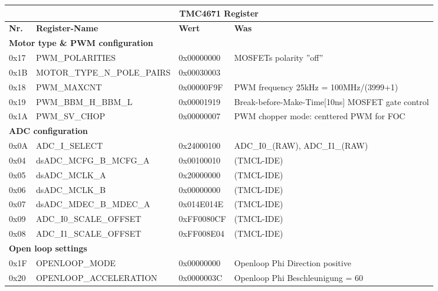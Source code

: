 \begin{table}[H]
\begin{tabularx}{\textwidth}{|l|l|l|X|}
\hline
\multicolumn{4}{|c|}{\textbf{TMC4671 Register}}               \\ \hline
\textbf{Nr. }& \textbf{Register-Name   }   & \textbf{Wert }      & \textbf{Was} \\ \hline
\multicolumn{4}{|l|}{\textbf{Motor type \&  PWM configuration}}        \\ \hline
0x17         & PWM\_POLARITIES             & 0x00000000 & MOSFETs polarity ''off''    \\ \hline
0x1B         & MOTOR\_TYPE\_N\_POLE\_PAIRS & 0x00030003 &     \\ \hline
0x18         & PWM\_MAXCNT                 & 0x00000F9F & PWM frequency 25kHz = 100MHz/(3999+1)   \\ \hline
0x19         & PWM\_BBM\_H\_BBM\_L         & 0x00001919 & Break-before-Make-Time[10ns] MOSFET gate control \\ \hline
0x1A         & PWM\_SV\_CHOP               & 0x00000007 & PWM chopper mode: centtered PWM for FOC \\ \hline
\multicolumn{4}{|l|}{\textbf{ADC configuration}}                       \\ \hline
0x0A         & ADC\_I\_SELECT              & 0x24000100 & ADC\_I0\_(RAW), ADC\_I1\_(RAW)    \\ \hline
0x04         & dsADC\_MCFG\_B\_MCFG\_A     & 0x00100010 & (TMCL-IDE)    \\ \hline
0x05         & dsADC\_MCLK\_A              & 0x20000000 & (TMCL-IDE)    \\ \hline
0x06         & dsADC\_MCLK\_B              & 0x00000000 & (TMCL-IDE)    \\ \hline
0x07         & dsADC\_MDEC\_B\_MDEC\_A     & 0x014E014E & (TMCL-IDE)    \\ \hline
0x09         & ADC\_I0\_SCALE\_OFFSET      & 0xFF0080CF & (TMCL-IDE)    \\ \hline
0x08         & ADC\_I1\_SCALE\_OFFSET      & 0xFF008E04 & (TMCL-IDE)    \\ \hline
\multicolumn{4}{|l|}{\textbf{Open loop settings}}                      \\ \hline
0x1F         & OPENLOOP\_MODE              & 0x00000000 & Openloop Phi Direction positive    \\ \hline
0x20         & OPENLOOP\_ACCELERATION      & 0x0000003C & Openloop Phi Beschleunigung = 60    \\ \hline

\end{tabularx}
\end{table}
